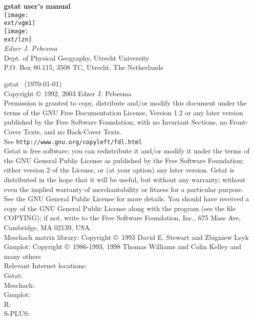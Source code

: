 \begin{titlepage} %
\begin{center}
{\huge{\bf gstat user's manual}} \\
\vspace{.8cm}
\texttt{[image: \\ext/vgm1]} \\
\vspace{.4cm}
\texttt{[image: \\ext/lzn]} \\
\vspace{.8cm}
{\em Edzer J. Pebesma} \\
Dept. of Physical Geography, Utrecht University \\
P.O. Box 80.115, 3508 TC, Utrecht, The Netherlands 
\end{center}

\newpage

\vspace*{\fill} %

\noindent
gstat \version\ (\today) \\[2mm]
Copyright \copyright\ 1992, 2003 Edzer J. Pebesma \\ 
Permission is granted to copy, distribute and/or modify this document
under the terms of the GNU Free Documentation License, Version 1.2 or
any later version published by the Free Software Foundation; with no
Invariant Sections, no Front-Cover Texts, and no Back-Cover Texts. \\
See {\tt http://www.gnu.org/copyleft/fdl.html} \\[2mm]

Gstat is free software; you can redistribute it and/or modify it under
the terms of the GNU General Public License as published by the Free
Software Foundation; either version 2 of the License, or (at your
option) any later version. Gstat is distributed in the hope that it will
be useful, but without any warranty; without even the implied warranty
of merchantability or fitness for a particular purpose.  See the GNU
General Public License for more details. You should have received a copy
of the GNU General Public License along with the program (see the file
COPYING); if not, write to the Free Software Foundation, Inc., 675 Mass
Ave, Cambridge, MA 02139, USA. \\[2mm]
Meschach matrix library: Copyright \copyright\ 1993 David E. Stewart and
Zbigniew Leyk \\[2mm]
Gnuplot: Copyright \copyright\ 1986-1993, 1998 Thomas Williams and Colin 
Kelley and many others \\[2mm]
Relevant Internet locations:\\
Gstat: \http \\
Meschach:  \\
Gnuplot:  \\
R:  \\
S-PLUS: 
\end{titlepage}
